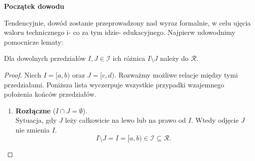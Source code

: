 \noindent \textbf{Początek dowodu}

Tendencyjnie, dowód zostanie przeprowadzony nad wyraz formalnie, w celu ujęcia waloru technicznego i- co za tym idzie- edukacyjnego.
Najpierw udowodnimy pomocnicze lematy:

\begin{lemma}
	Dla dowolnych przedziałów $I,J \in \mathcal{I}$ ich różnica $I\setminus J$ należy do $\mathcal{R}$.
\end{lemma} 
\begin{proof}
	Niech $I = [a, b)$ oraz $J = [c, d)$. Rozważmy możliwe relacje między tymi przedziałami. Poniższa lista wyczerpuje wszystkie przypadki wzajemnego położenia końców przedziałów.

    \begin{enumerate}[label=\textbf{\arabic*.}]
        
        \item \textbf{Rozłączne} ($I \cap J = \emptyset$).\\
        Sytuacja, gdy $J$ leży całkowicie na lewo lub na prawo od $I$. Wtedy odjęcie $J$ nie zmienia $I$.
        \[
            I \setminus J = I = [a, b) \in \mathcal{I} \subseteq \mathcal{R}.
        \]
        
        \begin{center}
        \end{center}


\end{enumerate}
\end{proof}
